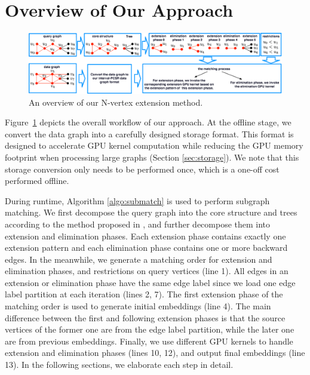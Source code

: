 
\section{Overview of Our Approach}
\begin{figure}
	\centering
	\includegraphics[width=\textwidth]{./figure/approachoverview.eps}
	\caption{An overview of our N-vertex extension method.}
	\label{fig:overview}
\end{figure}

Figure~\ref{fig:overview} depicts the overall workflow of our approach. At the offline stage, we convert the data graph into a carefully
designed storage format. This format is designed to accelerate GPU kernel computation while reducing the GPU memory footprint when
processing large graphs (Section \ref{sec:storage}). We note that this storage conversion only needs to be performed once, which is a one-off cost performed offline.

During runtime, Algorithm \ref{algo:submatch} is used to perform subgraph matching. We first decompose the query graph into the core structure and trees according to the method proposed in \cite{bi2016efficient}, and further decompose them into extension and elimination phases. Each extension phase contains exactly one extension pattern and each elimination phase contains one or more backward edges. In the meanwhile, we generate a matching order for extension and elimination phases, and restrictions on query vertices (line 1). All edges in an extension or elimination phase have the same edge label since we load one edge label partition at each iteration (lines 2, 7). The first extension phase of the matching order is used to generate initial embeddings (line 4). The main difference between the first and following extension phases is that the source vertices of the former one are from the edge label partition, while the later one are from previous embeddings. Finally, we use different GPU kernels to handle extension and elimination phases (lines 10, 12), and output final embeddings (line 13). In the following sections, we elaborate each step in detail.

